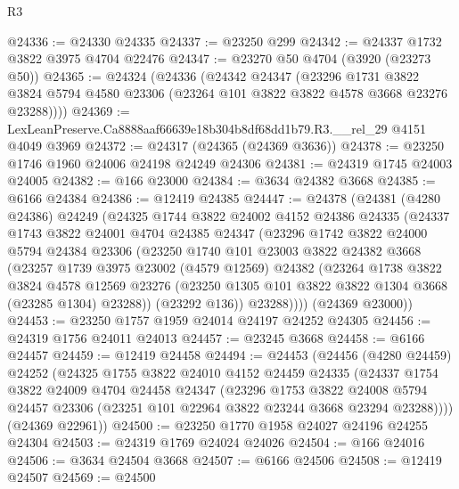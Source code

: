 \begin{lexlean}{R3}
\begin{coremodule}
@24336 := @24330 @24335
@24337 := @23250 @299
@24342 := @24337 @1732 @3822 @3975 @4704 @22476
@24347 := @23270 @50 @4704 (@3920 (@23273 @50))
@24365 := @24324
    (@24336
      (@24342
        @24347
        (@23296
          @1731
          @3822
          @3824
          @5794
          @4580
          @23306
          (@23264 @101 @3822 @3822 @4578 @3668 @23276 @23288))))
@24369 := LexLeanPreserve.Ca8888aaf66639e18b304b8df68dd1b79.R3.__rel_29 @4151 @4049 @3969
@24372 := @24317 (@24365 (@24369 @3636))
@24378 := @23250 @1746 @1960 @24006 @24198 @24249 @24306
@24381 := @24319 @1745 @24003 @24005
@24382 := @166 @23000
@24384 := @3634 @24382 @3668
@24385 := @6166 @24384
@24386 := @12419 @24385
@24447 := @24378
    (@24381
      (@4280 @24386)
      @24249
      (@24325
        @1744
        @3822
        @24002
        @4152
        @24386
        @24335
        (@24337
          @1743
          @3822
          @24001
          @4704
          @24385
          @24347
          (@23296
            @1742
            @3822
            @24000
            @5794
            @24384
            @23306
            (@23250
              @1740
              @101
              @23003
              @3822
              @24382
              @3668
              (@23257
                @1739
                @3975
                @23002
                (@4579 @12569)
                @24382
                (@23264
                  @1738
                  @3822
                  @3824
                  @4578
                  @12569
                  @23276
                  (@23250 @1305 @101 @3822 @3822 @1304 @3668 (@23285 @1304) @23288))
                (@23292 @136))
              @23288))))
      (@24369 @23000))
@24453 := @23250 @1757 @1959 @24014 @24197 @24252 @24305
@24456 := @24319 @1756 @24011 @24013
@24457 := @23245 @3668
@24458 := @6166 @24457
@24459 := @12419 @24458
@24494 := @24453
    (@24456
      (@4280 @24459)
      @24252
      (@24325
        @1755
        @3822
        @24010
        @4152
        @24459
        @24335
        (@24337
          @1754
          @3822
          @24009
          @4704
          @24458
          @24347
          (@23296
            @1753
            @3822
            @24008
            @5794
            @24457
            @23306
            (@23251 @101 @22964 @3822 @23244 @3668 @23294 @23288))))
      (@24369 @22961))
@24500 := @23250 @1770 @1958 @24027 @24196 @24255 @24304
@24503 := @24319 @1769 @24024 @24026
@24504 := @166 @24016
@24506 := @3634 @24504 @3668
@24507 := @6166 @24506
@24508 := @12419 @24507
@24569 := @24500

\end{coremodule}
\end{lexlean}
